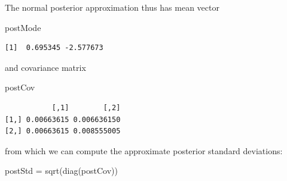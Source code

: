 \documentclass[
  letterpaper,
  DIV=11,
  numbers=noendperiod]{scrartcl}
\newenvironment{Shaded}{\begin{snugshade}}{\end{snugshade}}
\newcommand{\AttributeTok}[1]{\textcolor[rgb]{0.40,0.45,0.13}{#1}}
\newcommand{\CommentTok}[1]{\textcolor[rgb]{0.37,0.37,0.37}{#1}}
\newcommand{\ConstantTok}[1]{\textcolor[rgb]{0.56,0.35,0.01}{#1}}
\newcommand{\DecValTok}[1]{\textcolor[rgb]{0.68,0.00,0.00}{#1}}
\newcommand{\FunctionTok}[1]{\textcolor[rgb]{0.28,0.35,0.67}{#1}}
\newcommand{\NormalTok}[1]{\textcolor[rgb]{0.00,0.23,0.31}{#1}}
\newcommand{\OtherTok}[1]{\textcolor[rgb]{0.00,0.23,0.31}{#1}}
\newcommand{\SpecialCharTok}[1]{\textcolor[rgb]{0.37,0.37,0.37}{#1}}
\newcommand{\StringTok}[1]{\textcolor[rgb]{0.13,0.47,0.30}{#1}}
\begin{document}
\begin{tcolorbox}
\begin{Shaded}
\end{Shaded}

The normal posterior approximation thus has mean vector

\begin{Shaded}
\begin{Highlighting}[]
\NormalTok{postMode}
\end{Highlighting}
\end{Shaded}

\begin{verbatim}
[1]  0.695345 -2.577673
\end{verbatim}

and covariance matrix

\begin{Shaded}
\begin{Highlighting}[]
\NormalTok{postCov}
\end{Highlighting}
\end{Shaded}

\begin{verbatim}
           [,1]        [,2]
[1,] 0.00663615 0.006636150
[2,] 0.00663615 0.008555005
\end{verbatim}

from which we can compute the approximate posterior standard deviations:

\begin{Shaded}
\begin{Highlighting}[]
\NormalTok{postStd }\OtherTok{=} \FunctionTok{sqrt}\NormalTok{(}\FunctionTok{diag}\NormalTok{(postCov))}
\end{Highlighting}
\end{Shaded}

\end{tcolorbox}
\end{document}
